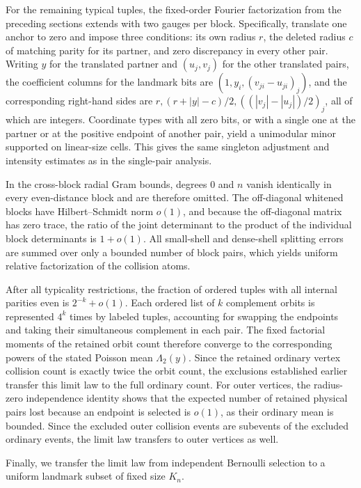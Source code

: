 For the remaining typical tuples, the fixed-order Fourier factorization from the preceding sections extends with two gauges per block. Specifically, translate one anchor to zero and impose three conditions: its own radius \(r\), the deleted radius \(c\) of matching parity for its partner, and zero discrepancy in every other pair. Writing \(y\) for the translated partner and \((u_j,v_j)\) for the other translated pairs, the coefficient columns for the landmark bits are \((1,y_i,(v_{ji}-u_{ji})_j)\), and the corresponding right-hand sides are \(r,(r+|y|-c)/2,((|v_j|-|u_j|)/2)_j\), all of which are integers. Coordinate types with all zero bits, or with a single one at the partner or at the positive endpoint of another pair, yield a unimodular minor supported on linear-size cells. This gives the same singleton adjustment and intensity estimates as in the single-pair analysis.

In the cross-block radial Gram bounds, degrees 0 and \(n\) vanish identically in every even-distance block and are therefore omitted. The off-diagonal whitened blocks have Hilbert--Schmidt norm \(o(1)\), and because the off-diagonal matrix has zero trace, the ratio of the joint determinant to the product of the individual block determinants is \(1+o(1)\). All small-shell and dense-shell splitting errors are summed over only a bounded number of block pairs, which yields uniform relative factorization of the collision atoms.

After all typicality restrictions, the fraction of ordered tuples with all internal parities even is \(2^{-k}+o(1)\). Each ordered list of \(k\) complement orbits is represented \(4^k\) times by labeled tuples, accounting for swapping the endpoints and taking their simultaneous complement in each pair. The fixed factorial moments of the retained orbit count therefore converge to the corresponding powers of the stated Poisson mean \(\Lambda_2(y)\). Since the retained ordinary vertex collision count is exactly twice the orbit count, the exclusions established earlier transfer this limit law to the full ordinary count. For outer vertices, the radius-zero independence identity shows that the expected number of retained physical pairs lost because an endpoint is selected is \(o(1)\), as their ordinary mean is bounded. Since the excluded outer collision events are subevents of the excluded ordinary events, the limit law transfers to outer vertices as well.

Finally, we transfer the limit law from independent Bernoulli selection to a uniform landmark subset of fixed size \(K_n\).

